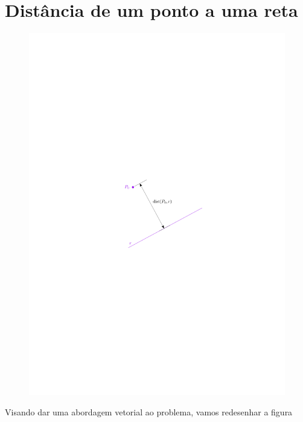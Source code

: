 \documentclass[a4paper, 12pt, brazilian]{article}
\begin{document}
	\section{Distância de um ponto a uma reta}
	\begin{figure}[H]
		\centering
		\includegraphics[scale=1.1]{images/dist}
		\label{fig:dist}
	\end{figure}
	Visando dar uma abordagem vetorial ao problema, vamos redesenhar a figura
\end{document}

